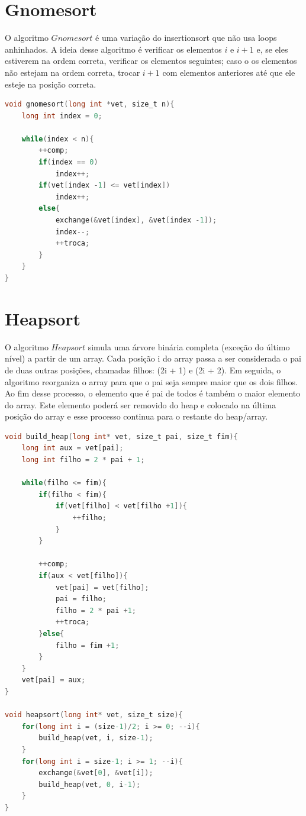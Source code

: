\documentclass[report]{uftex}
\begin{document}
\section{Gnomesort}

O algoritmo $Gnomesort$ é uma variação do insertionsort que não usa loops anhinhados. A ideia desse algoritmo é verificar os elementos $i$ e $i+1$ e, se eles estiverem na ordem correta, verificar os elementos seguintes; caso o os elementos não estejam na ordem correta, trocar $i+1$ com elementos anteriores até que ele esteje na posição correta.\\

\begin{lstlisting}[language=C]
void gnomesort(long int *vet, size_t n){
    long int index = 0;
  
    while(index < n){
        ++comp;
        if(index == 0)
            index++;
        if(vet[index -1] <= vet[index])
            index++;
        else{
            exchange(&vet[index], &vet[index -1]);
            index--;
            ++troca;
        }
    }
}
\end{lstlisting}


\section{Heapsort}
O algoritmo $Heapsort$ simula uma árvore binária completa (exceção do último nível) a partir de um array. Cada posição i do array passa a ser considerada o pai de duas outras posições, chamadas filhos: (2i + 1) e (2i + 2). Em seguida, o algoritmo reorganiza o array para que o pai seja sempre maior que os dois filhos. Ao fim desse processo, o elemento que é pai de todos é também o maior elemento do array. Este elemento poderá ser removido do heap e colocado na última posição do array e esse processo continua para o restante do heap/array.\\

\begin{lstlisting}[language=C]
void build_heap(long int* vet, size_t pai, size_t fim){
    long int aux = vet[pai];
    long int filho = 2 * pai + 1;

    while(filho <= fim){
        if(filho < fim){
            if(vet[filho] < vet[filho +1]){
                ++filho;
            }
        }

        ++comp;
        if(aux < vet[filho]){
            vet[pai] = vet[filho];
            pai = filho;
            filho = 2 * pai +1;
            ++troca;
        }else{
            filho = fim +1;
        }
    }
    vet[pai] = aux;
}

void heapsort(long int* vet, size_t size){
    for(long int i = (size-1)/2; i >= 0; --i){
        build_heap(vet, i, size-1);
    }
    for(long int i = size-1; i >= 1; --i){
        exchange(&vet[0], &vet[i]);
        build_heap(vet, 0, i-1);
    }
}
\end{lstlisting}
\end{document}

